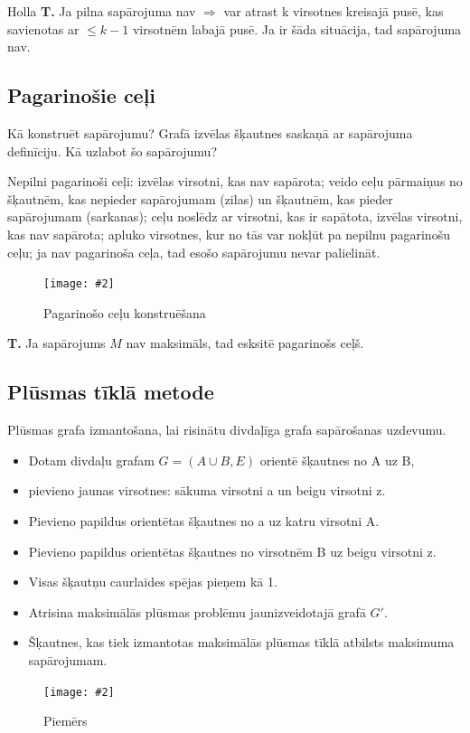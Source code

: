\documentclass{article}
\newcommand{\illustration}[3]{
	\begin{figure}[H]
		\centering	
		\texttt{[image: \#2]}
		\caption{#3}
	\end{figure}
}
\begin{document}
Holla \textbf{T. }Ja pilna sapārojuma nav $⇒$ var atrast k virsotnes kreisajā pusē, kas savienotas ar $\le k − 1$ virsotnēm labajā pusē.  Ja ir šāda situācija, tad sapārojuma nav.

\subsection{Pagarinošie ceļi}

Kā konstruēt sapārojumu?  Grafā izvēlas šķautnes saskaņā ar sapārojuma definīciju.  Kā uzlabot šo sapārojumu?

Nepilni pagarinoši ceļi: izvēlas virsotni, kas nav sapārota; veido ceļu pārmaiņus no šķautnēm, kas nepieder sapārojumam (zilas) un šķautnēm, kas pieder sapārojumam (sarkanas); ceļu noslēdz ar virsotni, kas ir sapātota, izvēlas virsotni, kas nav sapārota; apluko virsotnes, kur no tās var nokļūt pa nepilnu pagarinošu ceļu; ja nav pagarinoša ceļa, tad esošo sapārojumu nevar palielināt.

\illustration{1}{nepilni_pagar_celi-1}{Pagarinošo ceļu konstruēšana}

\textbf{T. } Ja sapārojums $M$ nav maksimāls, tad esksitē pagarinošs ceļš.

\subsection{Plūsmas tīklā metode}

Plūsmas grafa izmantošana, lai risinātu divdaļīga grafa sapārošanas uzdevumu.

\begin{itemize}
	 \item Dotam divdaļu grafam $G = (A \cup B, E )$ orientē šķautnes no A uz B,  \item pievieno jaunas virsotnes: sākuma virsotni a un beigu virsotni z.
	 \item Pievieno papildus orientētas šķautnes no a uz katru virsotni A. \item Pievieno papildus orientētas šķautnes no virsotnēm B uz beigu virsotni z.
	 \item Visas šķautņu caurlaides spējas pieņem kā 1.
	 \item Atrisina maksimālās plūsmas problēmu jaunizveidotajā grafā $G'$.  
	 \item Šķautnes, kas tiek izmantotas maksimālās plūsmas tīklā atbilsts maksimuma sapārojumam.
\end{itemize}

\illustration{1}{flow_pairing-1}{Piemērs}


\printindex
\end{document}
